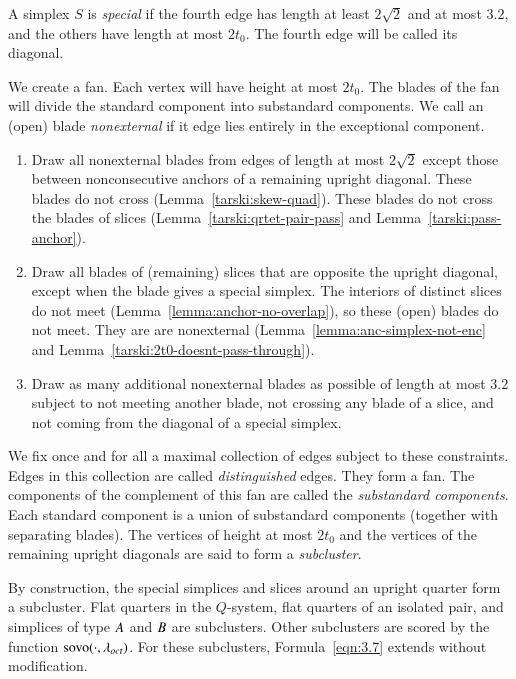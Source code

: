 \begin{definition}[special]
A simplex $S$ is {\it special\/} if the fourth edge has length at
least $2\sqrt{2}$ and at most $3.2$, and the others have length at
most $2t_0$. The fourth edge will be called its diagonal.
\end{definition}

We create a fan.  Each vertex will have
height at most $2t_0$.  The blades of the fan
will divide the standard component into substandard components. We
call an (open) blade {\it nonexternal\/} if it
edge lies entirely in the exceptional component.

\begin{enumerate}
\item Draw all nonexternal blades from edges of length at most $2\sqrt{2}$
except those between nonconsecutive anchors of a remaining upright
diagonal. These blades do not cross (Lemma~\ref{tarski:skew-quad}).
These blades do not cross the blades of slices
(Lemma~\ref{tarski:qrtet-pair-pass} and
Lemma~\ref{tarski:pass-anchor}).

\item Draw all blades of (remaining) slices
that are opposite the upright diagonal, except when the blade gives
a special simplex. The interiors of distinct slices do
not meet (Lemma~\ref{lemma:anchor-no-overlap}), so these (open) blades do
not meet. They are are nonexternal 
(Lemma~\ref{lemma:anc-simplex-not-enc} and
Lemma~\ref{tarski:2t0-doesnt-pass-through}).

\item Draw as many additional nonexternal blades as possible of
length at most $3.2$ subject to not meeting another blade, not
crossing any blade of a slice, and not coming from  the
diagonal of a special simplex.
\end{enumerate}

We fix once and for all a maximal collection of edges subject to
these constraints. Edges in this collection are called {\it
distinguished\/} edges.  They form a fan.  The components of the complement
of this fan are
called the {\it substandard components}.  Each standard component is a union of
substandard components (together with separating blades). 
The vertices of height at most $2t_0$ and the vertices
of the remaining upright diagonals are said to form a {\it
subcluster}.


By construction, the special simplices and slices
around an upright quarter form a subcluster.  Flat quarters in the
$Q$-system, flat quarters of an isolated pair, and simplices of
type $A$ and $B$ are subclusters.  Other subclusters are
scored by the function ${\operatorname{sovo}}(\cdot,\lambda_{oct})$. 
For these subclusters,
Formula~\ref{eqn:3.7} extends without modification.

